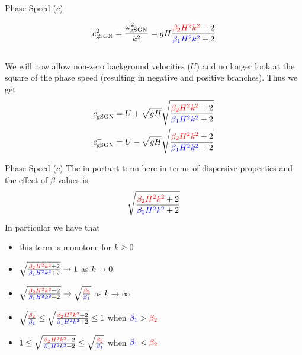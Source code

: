 \documentclass[pdf]{beamer}
\begin{document}
\begin{frame}{Phase Speed ($c$)}

$$c_{\text{gSGN}}^2 = \dfrac{\omega_{\text{gSGN}}^2}{k^2} = gH \dfrac{{\color{red}\beta_2 H^2 k^2} + 2}{ {\color{blue}\beta_1 H^2 k^2} + 2} $$
\\
\pause
We will now allow non-zero background velocities ($U$) and no longer look at the square of the phase speed (resulting in negative and positive branches). Thus we get
\begin{align*}
c^+_{\text{gSGN}} &= U + \sqrt{gH} \sqrt{ \dfrac{{\color{red}\beta_2 H^2 k^2} + 2}{ {\color{blue}\beta_1 H^2 k^2} + 2}} \\
c^-_{\text{gSGN}} &= U - \sqrt{gH} \sqrt{ \dfrac{{\color{red}\beta_2 H^2 k^2} + 2}{ {\color{blue}\beta_1 H^2 k^2} + 2}}
\end{align*}

\end{frame}

\begin{frame}{Phase Speed ($c$)}
The important term here in terms of dispersive properties and the effect of $\beta$ values is
\[\sqrt{ \dfrac{{\color{red}\beta_2 H^2 k^2} + 2}{ {\color{blue}\beta_1 H^2 k^2} + 2}}\]
In particular we have that 
\begin{itemize}
	\item this term is monotone for $k \ge 0 $
	\item $\sqrt{ \frac{{\color{red}\beta_2 H^2 k^2} + 2}{ {\color{blue}\beta_1 H^2 k^2} + 2}} \rightarrow 1 $ as $k \rightarrow 0$
	\item $\sqrt{ \frac{{\color{red}\beta_2 H^2 k^2} + 2}{ {\color{blue}\beta_1 H^2 k^2} + 2}} \rightarrow \sqrt{\frac{{\color{red}\beta_2 }}{{\color{blue}\beta_1 }}} $ as $k \rightarrow \infty$
		\item  $ \sqrt{\frac{{\color{red}\beta_2 }}{{\color{blue}\beta_1 }}} \le
	\sqrt{ \frac{{\color{red}\beta_2 H^2 k^2} + 2}{ {\color{blue}\beta_1 H^2 k^2} + 2}} \le  1$  when ${\color{blue}\beta_1 } > {\color{red}\beta_2 }$
	\item $1 \le \sqrt{ \frac{{\color{red}\beta_2 H^2 k^2} + 2}{ {\color{blue}\beta_1 H^2 k^2} + 2}} \le  \sqrt{\frac{{\color{red}\beta_2 }}{{\color{blue}\beta_1 }}}$ when ${\color{blue}\beta_1 } < {\color{red}\beta_2 }$ 
\end{itemize}

\end{frame}
\end{document}
